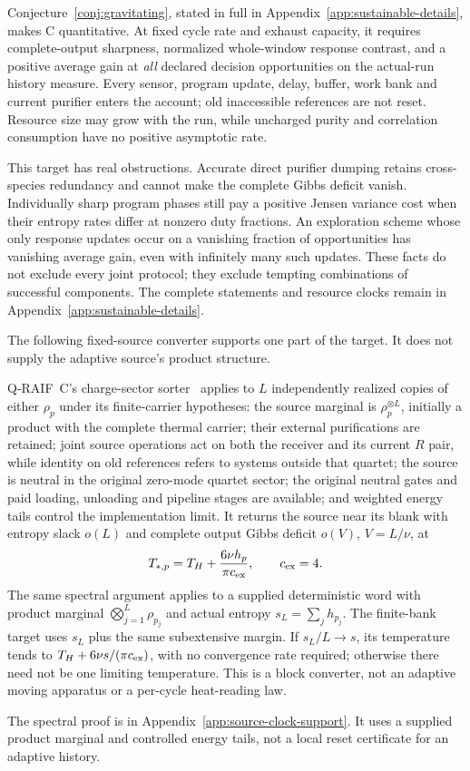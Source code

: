 Conjecture~\ref{conj:gravitating}, stated in full in
Appendix~\ref{app:sustainable-details}, makes C quantitative.
At fixed cycle rate and exhaust capacity, it requires complete-output
sharpness, normalized whole-window response contrast, and a positive
average gain at \emph{all} declared decision opportunities on the
actual-run history measure. Every sensor, program update, delay,
buffer, work bank and current purifier enters the account; old
inaccessible references are not reset. Resource size may grow with
the run, while uncharged purity and correlation consumption have no
positive asymptotic rate.

This target has real obstructions. Accurate direct purifier dumping
retains cross-species redundancy and cannot make the complete Gibbs
deficit vanish. Individually sharp program phases still pay a positive
Jensen variance cost when their entropy rates differ at nonzero duty
fractions. An exploration scheme whose only response updates occur
on a vanishing fraction of opportunities has vanishing average gain,
even with infinitely many such updates. These facts do not exclude
every joint protocol; they exclude tempting combinations of successful
components. The complete statements and resource clocks remain in
Appendix~\ref{app:sustainable-details}.

The following fixed-source converter supports one part of the target.
It does not supply the adaptive source's product structure.

\begin{proposition}
\label{prop:pointer-sort}
Q-RAIF~C's charge-sector sorter~\cite{QRC} applies to $L$ independently
realized copies of either $\rho_p$ under its finite-carrier hypotheses:
the source marginal is $\rho_p^{\otimes L}$, initially a product with
the complete thermal carrier; their external purifications are retained;
joint source operations act on both the receiver and its current $R$
pair, while identity on old references refers to systems outside that
quartet;
the source is neutral in the original zero-mode quartet sector; the
original neutral gates and paid loading, unloading and pipeline stages
are available; and weighted energy tails control the implementation
limit. It returns the source near its blank with entropy slack $o(L)$
and complete output Gibbs deficit $o(V)$, $V=L/\nu$, at
\[
 T_{*,p}=T_H+\frac{6\nu h_p}{\pi c_{\rm ex}},\qquad c_{\rm ex}=4.
\]
The same spectral argument applies to a supplied deterministic word
with product marginal $\bigotimes_{j=1}^L\rho_{p_j}$ and actual entropy
$s_L=\sum_jh_{p_j}$. The finite-bank target uses $s_L$ plus the same
subextensive margin. If $s_L/L\to s$, its temperature tends to
$T_H+6\nu s/(\pi c_{\rm ex})$, with no convergence rate required;
otherwise there need not be one limiting temperature. This is a block
converter, not an adaptive moving apparatus or a per-cycle heat-reading law.
\end{proposition}
The spectral proof is in Appendix~\ref{app:source-clock-support}.
It uses a supplied product marginal and controlled energy tails, not
a local reset certificate for an adaptive history.

